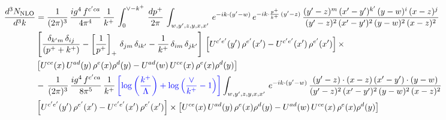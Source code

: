 \documentclass[9pt]{article}
\numberwithin{equation}{section}
\begin{document}
\begin{align}
    \frac{d^{3}N_{\rm NLO}}{d^{3}k} & = \frac{1}{(2\pi)^{3}}\, \frac{ig^{4}\,f^{c'ca}}{4\pi^{4}}\, \frac{1}{k^{+}}\,\int_{0}^{\vee-k^{+}}\, \frac{dp^{+}}{2\pi}\, \int_{w,y',z,y,x,x'}\, e^{-ik\cdot (y'-w)}\, e^{-ik\cdot \frac{p^{+}}{k^{+}}\,(y'-z)}\,\frac{(y'-z)^{m}\,(x'-y')^{k'}\,(y-w)^{i}\,(x-z)^{j}}{(y'-z)^{2}\,(x'-y')^{2}\,(y-w)^{2}\,(x-z)^{2}}\notag \\ & \left[\frac{\delta_{k'm}\,\delta_{ij}}{(p^{+}+k^{+})}-\left[\frac{1}{p^{+}}\right]_{+}\,\delta_{jm}\,\delta_{ik'}-\frac{1}{k^{+}}\, \delta_{im}\, \delta_{jk'}\right]\, \left[U^{c'e'}(y')\,\rho^{e'}(x')-U^{c'e'}(x')\,\rho^{e'}(x')\right]\times \notag \\ &  \left[U^{ce}(x)\,U^{ad}(y)\,\rho^{e}(x)\rho^{d}(y)-U^{ad}(w)\,U^{ce}(x)\,\rho^{e}(x)\rho^{d}(y)\right]\notag \\ & -\,\frac{1}{(2\pi)^{3}}\, \frac{ig^{4}\,f^{c'ca}}{8\pi^{5}}\, \frac{1}{k^{+}}\,{\color{blue}\left[\log{\left(\frac{k^{+}}{\Lambda}\right)}+\log{\left(\frac{\vee}{k^{+}}-1\right)}\right]} \int_{w,y',z,y,x,x'}\, e^{-ik\cdot (y'-w)}\,\frac{(y'-z)\cdot (x-z)\,(x'-y')\cdot (y-w)}{(y'-z)^{2}\,(x'-y')^{2}\,(y-w)^{2}\,(x-z)^{2}}\notag \\ & \left[U^{c'e'}(y')\,\rho^{e'}(x')-U^{c'e'}(x')\,\rho^{e'}(x')\right]\times  \left[U^{ce}(x)\,U^{ad}(y)\,\rho^{e}(x)\rho^{d}(y)-U^{ad}(w)\,U^{ce}(x)\,\rho^{e}(x)\rho^{d}(y)\right]
\end{align}
\end{document}
